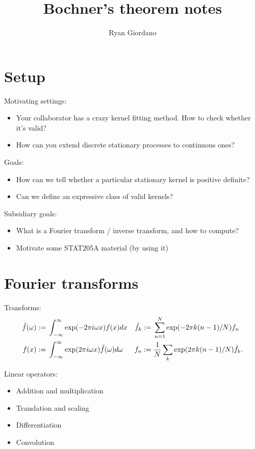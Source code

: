 \documentclass[twoside,11pt]{article}
\numberwithin{equation}{section}
\begin{document}
\title{Bochner's theorem notes}

\author{Ryan Giordano}

\maketitle

\section*{Setup}

Motivating settings:
%
\begin{itemize}
    \item Your collaborator has a crazy kernel fitting method.  How to check whether it's valid?
    \item How can you extend discrete stationary processes to continuous ones?
\end{itemize}
%

Goals:
%
\begin{itemize}
\item How can we tell whether a particular stationary kernel is positive definite?
\item Can we define an expressive class of valid kernels?
\end{itemize}


Subsidiary goals:
%
\begin{itemize}
\item What is a Fourier transform / inverse transform, and how to compute?
\item Motivate some STAT205A material (by using it)
\end{itemize}


\newpage
\section*{Fourier transforms}

Transforms:
%
\begin{align*}
    \hat{f}(\omega) :={}& \int_{-\infty}^{\infty} \exp(-2\pi i \omega x) f(x) dx &
    \tilde{f}_k :={}& \sum_{n=1}^N \exp(-2 \pi k (n - 1) / N) f_n \\
    f(x) :={}& \int_{-\infty}^{\infty} \exp(2\pi i \omega x) \hat{f}(\omega) d\omega &
    f_n :={}& \frac{1}{N} \sum_{k} \exp(2 \pi k (n - 1) / N) \tilde{f}_k.
\end{align*}
%

Linear operators:
%
\begin{itemize}
    \item Addition and multiplication
    \item Translation and scaling
    \item Differentiation
    \item Convolution
\end{itemize}
%
\end{document}

